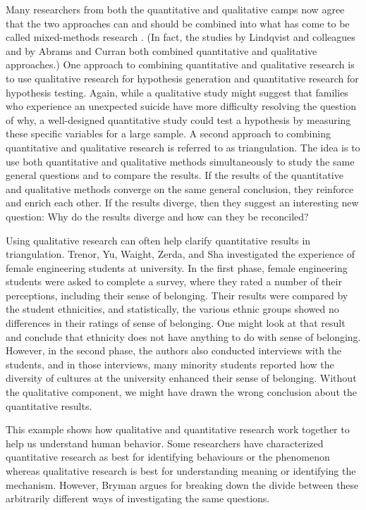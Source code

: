 Many researchers from both the quantitative and qualitative camps now agree that the two approaches can and should be combined into what has come to be called mixed-methods research \citep{todd_mixing_2004}. (In fact, the studies by Lindqvist and colleagues and by Abrams and Curran both combined quantitative and qualitative approaches.) One approach to combining quantitative and qualitative research is to use qualitative research for hypothesis generation and quantitative research for hypothesis testing. Again, while a qualitative study might suggest that families who experience an unexpected suicide have more difficulty resolving the question of why, a well-designed quantitative study could test a hypothesis by measuring these specific variables for a large sample. A second approach to combining quantitative and qualitative research is referred to as triangulation. The idea is to use both quantitative and qualitative methods simultaneously to study the same general questions and to compare the results. If the results of the quantitative and qualitative methods converge on the same general conclusion, they reinforce and enrich each other. If the results diverge, then they suggest an interesting new question: Why do the results diverge and how can they be reconciled?

Using qualitative research can often help clarify quantitative results in triangulation. Trenor, Yu, Waight, Zerda, and Sha \citeyear{trenor_relations_2008} investigated the experience of female engineering students at university. In the first phase, female engineering students were asked to complete a survey, where they rated a number of their perceptions, including their sense of belonging. Their results were compared by the student ethnicities, and statistically, the various ethnic groups showed no differences in their ratings of sense of belonging. One might look at that result and conclude that ethnicity does not have anything to do with sense of belonging. However, in the second phase, the authors also conducted interviews with the students, and in those interviews, many minority students reported how the diversity of cultures at the university enhanced their sense of belonging. Without the qualitative component, we might have drawn the wrong conclusion about the quantitative results.

This example shows how qualitative and quantitative research work together to help us understand human behavior. Some researchers have characterized quantitative research as best for identifying behaviours or the phenomenon whereas qualitative research is best for understanding meaning or identifying the mechanism. However, Bryman \citeyear{bryman_social_2015} argues for breaking down the divide between these arbitrarily different ways of investigating the same questions.


